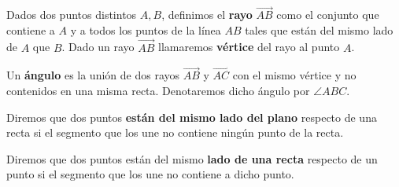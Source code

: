 \begin{defin*}
\end{defin*}



\begin{defin*}
\end{defin*}


\begin{defin*}[Triángulos]
\end{defin*}


\begin{defin*}[Rayos]
	Dados dos puntos distintos $A, B$, definimos el \textbf{rayo}
	$\overrightarrow{AB}$ como el conjunto que contiene a $A$ y a todos los puntos
	de la línea $AB$ tales que están del mismo lado de $A$ que $B$. Dado un rayo
	$\overrightarrow{AB}$ llamaremos \textbf{vértice} del rayo al punto $A$.
\end{defin*}


\begin{defin*}[Ángulos]
	Un \textbf{ángulo} es la unión de dos rayos $\overrightarrow{AB}$ y
	$\overrightarrow{AC}$ con el mismo vértice y no contenidos en una misma recta.
	Denotaremos dicho ángulo por $\angle ABC$.
\end{defin*}


\begin{defin*}
	Diremos que dos puntos \textbf{están del mismo lado del plano} respecto de una
	recta si el segmento que los une no contiene ningún punto de la recta.

	Diremos que dos puntos están del mismo \textbf{lado de una recta} respecto de
	un punto si el segmento que los une no contiene a dicho punto.
\end{defin*}


